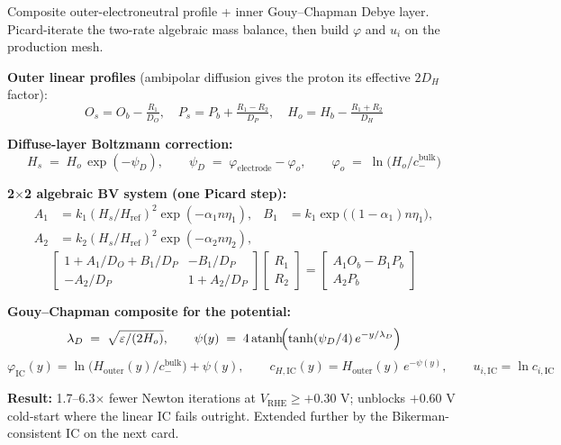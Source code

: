 \documentclass[11pt]{article}
\newcommand{\VRHE}{V_{\mathrm{RHE}}}
\begin{document}
\begin{tcolorbox}[cardstyle={Debye--Boltzmann analytical IC}]
Composite outer-electroneutral profile + inner Gouy--Chapman Debye
layer. Picard-iterate the two-rate algebraic mass balance, then build
\(\varphi\) and \(u_i\) on the production mesh.

\textbf{Outer linear profiles} (ambipolar diffusion gives the proton
its effective \(2 D_H\) factor):
\[
  O_s = O_b - \tfrac{R_1}{D_O},\quad
  P_s = P_b + \tfrac{R_1 - R_2}{D_P},\quad
  H_o = H_b - \tfrac{R_1+R_2}{D_H}
\]

\textbf{Diffuse-layer Boltzmann correction:}
\[
  H_s \;=\; H_o\,\exp(-\psi_D),\qquad
  \psi_D \;=\; \varphi_{\mathrm{electrode}} - \varphi_o,\qquad
  \varphi_o \;=\; \ln\!\bigl(H_o / c_{-}^{\mathrm{bulk}}\bigr)
\]

\textbf{2$\times$2 algebraic BV system (one Picard step):}
\begin{align*}
  A_1 &= k_1 (H_s/H_{\mathrm{ref}})^2 \exp(-\alpha_1 n\eta_1), &
  B_1 &= k_1 \exp\bigl((1-\alpha_1) n\eta_1\bigr),\\
  A_2 &= k_2 (H_s/H_{\mathrm{ref}})^2 \exp(-\alpha_2 n\eta_2),
\end{align*}
\[
  \begin{bmatrix}
    1 + A_1/D_O + B_1/D_P & -B_1/D_P\\
    -A_2/D_P              & 1 + A_2/D_P
  \end{bmatrix}\!
  \begin{bmatrix} R_1 \\ R_2 \end{bmatrix}
   =
  \begin{bmatrix} A_1 O_b - B_1 P_b \\ A_2 P_b \end{bmatrix}
\]

\textbf{Gouy--Chapman composite for the potential:}
\[
  \lambda_D \;=\; \sqrt{\varepsilon/(2 H_o)},\qquad
  \psi(y) \;=\; 4\,\mathrm{atanh}\!\Bigl(\tanh(\psi_D/4)\,e^{-y/\lambda_D}\Bigr)
\]
\[
  \varphi_{\mathrm{IC}}(y) = \ln\!\bigl(H_{\mathrm{outer}}(y)/c_{-}^{\mathrm{bulk}}\bigr) + \psi(y),
  \qquad
  c_{H,\mathrm{IC}}(y) = H_{\mathrm{outer}}(y)\,e^{-\psi(y)},
  \qquad
  u_{i,\mathrm{IC}} = \ln c_{i,\mathrm{IC}}
\]

\textbf{Result:} 1.7--6.3$\times$ fewer Newton iterations at
\(\VRHE\ge +0.30\) V; unblocks \(+0.60\) V cold-start where the linear
IC fails outright. Extended further by the Bikerman-consistent IC
on the next card.
\end{tcolorbox}
\end{document}
